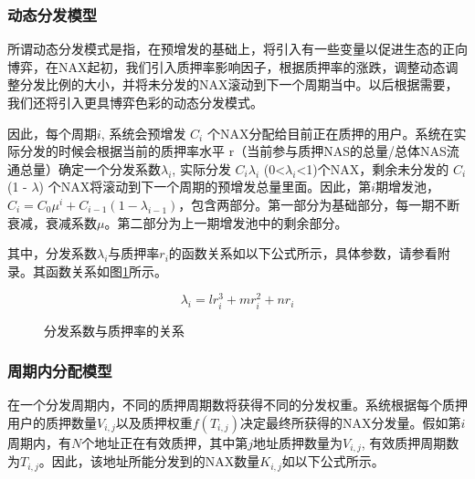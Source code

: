 \subsubsection{动态分发模型}
所谓动态分发模式是指，在预增发的基础上，将引入有一些变量以促进生态的正向博弈，在NAX起初，我们引入质押率影响因子，根据质押率的涨跌，调整动态调整分发比例的大小，并将未分发的NAX滚动到下一个周期当中。以后根据需要，我们还将引入更具博弈色彩的动态分发模式。

因此，每个周期$i$, 系统会预增发 $C_i$ 个NAX分配给目前正在质押的用户。系统在实际分发的时候会根据当前的质押率水平 r（当前参与质押NAS的总量/总体NAS流通总量）确定一个分发系数$\lambda_i$, 实际分发 $C_i$$\lambda_i$ (0<$\lambda_i$<1)个NAX，剩余未分发的 $C_i$(1 - $\lambda$) 个NAX将滚动到下一个周期的预增发总量里面。因此，第\(i\)期增发池，\(C_i = C_0 \mu^i + C_{i-1} (1-\lambda_{i-1})\)，包含两部分。第一部分为基础部分，每一期不断衰减，衰减系数$\mu$。第二部分为上一期增发池中的剩余部分。


其中，分发系数\(\lambda_i\)与质押率\(r_i\)的函数关系如以下公式所示，具体参数，请参看附录。其函数关系如图\ref{func}所示。

  \begin{equation}
    \lambda_i = l r_i^3 + m r_i^2 + n r_i
  \end{equation}

\begin{figure}
\centering
    \caption{分发系数与质押率的关系}\label{func}
\end{figure}



\subsubsection{周期内分配模型}
在一个分发周期内，不同的质押周期数将获得不同的分发权重。系统根据每个质押用户的质押数量$V_{i,j}$以及质押权重\(f(T_{i,j})\)决定最终所获得的NAX分发量。假如第$i$周期内，有$N$个地址正在有效质押，其中第$j$地址质押数量为$V_{i,j}$, 有效质押周期数为$T_{i,j}$。因此，该地址所能分发到的NAX数量$K_{i,j}$如以下公式所示。

